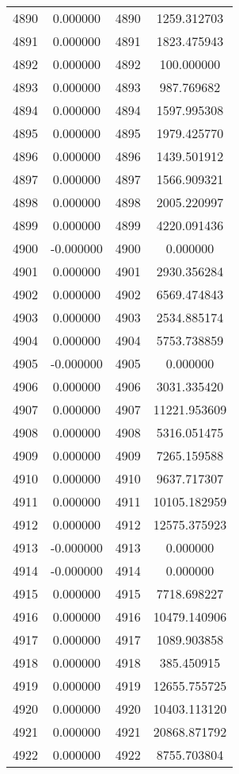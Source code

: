 \documentclass[12pt]{article}
\begin{document}
\begin{longtable}{@{}cccc@{}}
4890 & 0.000000 & 4890 & 1259.312703 \\
4891 & 0.000000 & 4891 & 1823.475943 \\
4892 & 0.000000 & 4892 & 100.000000 \\
4893 & 0.000000 & 4893 & 987.769682 \\
4894 & 0.000000 & 4894 & 1597.995308 \\
4895 & 0.000000 & 4895 & 1979.425770 \\
4896 & 0.000000 & 4896 & 1439.501912 \\
4897 & 0.000000 & 4897 & 1566.909321 \\
4898 & 0.000000 & 4898 & 2005.220997 \\
4899 & 0.000000 & 4899 & 4220.091436 \\
4900 & -0.000000 & 4900 & 0.000000 \\
4901 & 0.000000 & 4901 & 2930.356284 \\
4902 & 0.000000 & 4902 & 6569.474843 \\
4903 & 0.000000 & 4903 & 2534.885174 \\
4904 & 0.000000 & 4904 & 5753.738859 \\
4905 & -0.000000 & 4905 & 0.000000 \\
4906 & 0.000000 & 4906 & 3031.335420 \\
4907 & 0.000000 & 4907 & 11221.953609 \\
4908 & 0.000000 & 4908 & 5316.051475 \\
4909 & 0.000000 & 4909 & 7265.159588 \\
4910 & 0.000000 & 4910 & 9637.717307 \\
4911 & 0.000000 & 4911 & 10105.182959 \\
4912 & 0.000000 & 4912 & 12575.375923 \\
4913 & -0.000000 & 4913 & 0.000000 \\
4914 & -0.000000 & 4914 & 0.000000 \\
4915 & 0.000000 & 4915 & 7718.698227 \\
4916 & 0.000000 & 4916 & 10479.140906 \\
4917 & 0.000000 & 4917 & 1089.903858 \\
4918 & 0.000000 & 4918 & 385.450915 \\
4919 & 0.000000 & 4919 & 12655.755725 \\
4920 & 0.000000 & 4920 & 10403.113120 \\
4921 & 0.000000 & 4921 & 20868.871792 \\
4922 & 0.000000 & 4922 & 8755.703804 \\

\end{longtable}
\end{document}
